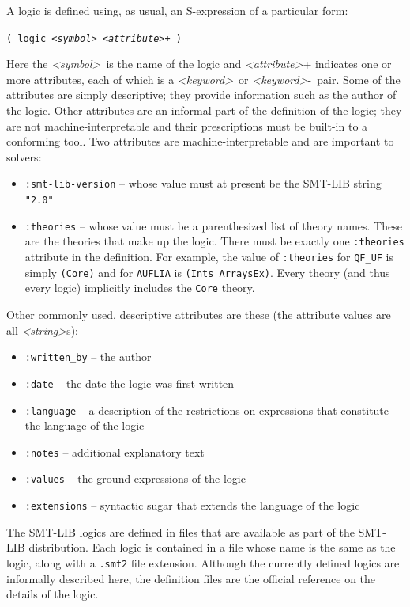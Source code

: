 \documentclass[12pt,oneside]{report}
\newcommand{\keyword}{{\it <keyword>}}
\newcommand{\attrvalue}{{\it <attr-value>}}
\newcommand{\attribute}{{\it <attribute>}}
\newcommand{\sym}{{\it <symbol>}}
\newcommand{\strng}{{\it <string>}} %
\newcommand{\nospace}{\setlength{\itemsep}{0in}\setlength{\parsep}{0in}\setlength{\parskip}{0in}\setlength{\topsep}{0in}}
\begin{document}
A logic is defined using, as usual, an S-expression of a particular form:\\
\centerline{\tt ( logic \sym~\attribute+ ) }
Here the \sym\ is the name of the logic and \attribute+ indicates one or more attributes, each of which is
a \keyword\ or \keyword-\attrvalue\ pair.
Some of the attributes are simply descriptive; they provide information such as the author of the logic.
Other attributes are an informal part of the definition of the logic; they are not machine-interpretable and their
prescriptions must be built-in to a conforming tool.
Two attributes are machine-interpretable and are important to solvers:
\begin{itemize}
\item {\tt :smt-lib-version} -- whose value must at present be the SMT-LIB string {\tt "2.0"}
\item {\tt :theories} -- whose value must be a parenthesized list of theory names. These are the theories that
make up the logic. There must be exactly one {\tt :theories} attribute in the definition. For example, the value of
{\tt :theories} for {\tt QF\_UF} is simply {\tt (Core)} and for {\tt AUFLIA} is {\tt (Ints ArraysEx)}.
Every theory (and thus every logic) implicitly includes the {\tt Core} theory.
\end{itemize}

Other commonly used, descriptive attributes are these (the attribute values are all \strng s):
\begin{itemize} \nospace
\item {\tt :written\_by} -- the author
\item {\tt :date} -- the date the logic was first written
\item {\tt :language} -- a description of the restrictions on expressions that constitute the language of the logic
\item {\tt :notes} -- additional explanatory text
\item {\tt :values} -- the ground expressions of the logic 
\item {\tt :extensions} -- syntactic sugar that extends the language of the logic
\end{itemize}

The SMT-LIB logics are defined in files that are available as part of the SMT-LIB distribution.  Each logic is
contained in a file whose name is the same as the logic, along with a {\tt .smt2} file extension. Although the 
currently defined logics are informally described here, the definition files are the official reference on the
details of the logic.
\end{document}

